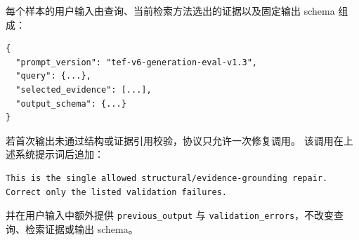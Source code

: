 每个样本的用户输入由查询、当前检索方法选出的证据以及固定输出 schema 组成：

\begin{lstlisting}
{
  "prompt_version": "tef-v6-generation-eval-v1.3",
  "query": {...},
  "selected_evidence": [...],
  "output_schema": {...}
}
\end{lstlisting}

若首次输出未通过结构或证据引用校验，协议只允许一次修复调用。
该调用在上述系统提示词后追加：

\begin{lstlisting}
This is the single allowed structural/evidence-grounding repair.
Correct only the listed validation failures.
\end{lstlisting}

并在用户输入中额外提供 \texttt{previous\_output} 与
\texttt{validation\_errors}，不改变查询、检索证据或输出 schema。

